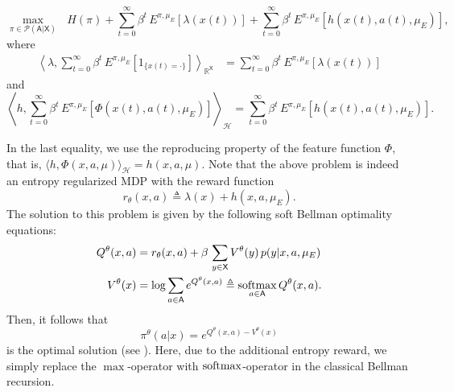 \documentclass[11pt]{article}
\newcommand{\R}{\mathbb{R}}
\newcommand{\softmax}{\mathop{\rm softmax}}
\newcommand{\argmax}{\mathop{\rm arg\, max}}
\newcommand{\sX}{{\mathsf X}}
\newcommand{\sA}{{\mathsf A}}
\newcommand{\cH}{{\mathcal H}}
\newcommand{\V}{{\mathcal V}}
\newcommand{\Pnew}{{\mathcal P}}
\begin{document}
$$\max_{\pi \in \Pnew(\sA|\sX)} \text{ }  H(\pi) + \sum_{t=0}^{\infty} \beta^t \, E^{\pi,\mu_E}[\lambda(x(t))] + \sum_{t=0}^{\infty} \beta^t \, E^{\pi,\mu_E}[h(x(t),a(t),\mu_E)],$$
where 
\begin{align*}
\left \langle \lambda, \sum_{t=0}^{\infty} \beta^t \, E^{\pi,\mu_E}[1_{\{x(t)=\cdot\}}]\right \rangle_{\R^{\sX}} &= \sum_{t=0}^{\infty} \beta^t \, E^{\pi,\mu_E}[\lambda(x(t))]
\end{align*}
and
$$\left \langle h, \sum_{t=0}^{\infty} \beta^t \, E^{\pi,\mu_E}[\Phi(x(t),a(t),\mu_E)] \right \rangle_{\cH}  = \sum_{t=0}^{\infty} \beta^t \, E^{\pi,\mu_E}[h(x(t),a(t),\mu_E)].$$

In the last equality, we use the reproducing property of the feature function $\Phi$, that is, $\langle h,\Phi(x,a,\mu) \rangle_{\cH} = h(x,a,\mu)$. Note that the above problem is 
indeed an entropy regularized MDP with the reward function 
$$r_{\theta}(x,a) \triangleq \lambda(x) + h(x,a,\mu_E).$$ 
The solution to this problem is given by the following soft Bellman optimality equations:
\begin{align*}
Q^{\theta}(x,a) &= r_{\theta}(x,a) + \beta \, \sum_{y \in \sX} V^{\theta}(y) \, p(y|x,a,\mu_E) \\
V^{\theta}(x) &= \log \sum_{a \in \sA} e^{Q^{\theta}(x,a)} \triangleq \softmax_{a \in \sA} Q^{\theta}(x,a).
\end{align*}
Then, it follows that
$$
\pi^{\theta}(a|x) = e^{Q^{\theta}(x,a)-V^{\theta}(x)}
$$
is the optimal solution (see \cite{NeJoGo17}). Here, due to the additional entropy reward, we simply replace the $\max$-operator with $\softmax$-operator in the classical Bellman recursion. 

%
\end{document}
